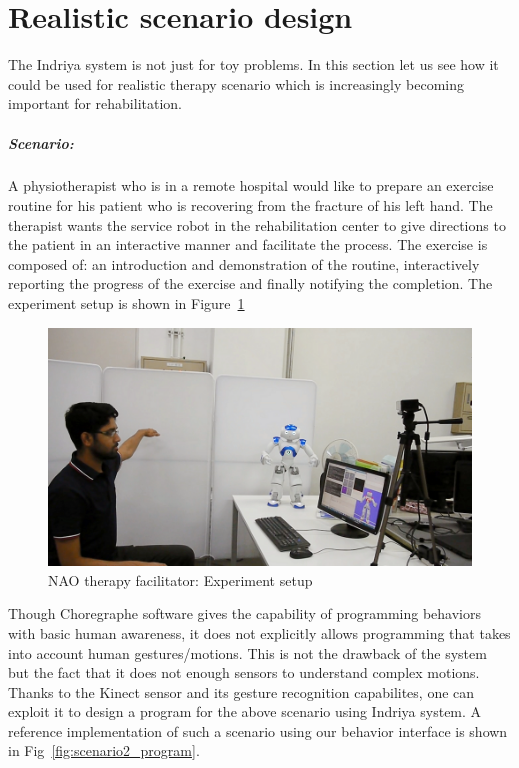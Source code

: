 \section{Realistic scenario design}
The Indriya system is not just for toy problems. In this section let us see how it could be used for realistic therapy scenario which is increasingly becoming important for rehabilitation. 
\subparagraph{Scenario:}A physiotherapist who is in a remote hospital would like to prepare an exercise routine for his patient who is recovering from the fracture of his left hand. The therapist wants the service robot in the rehabilitation center to give directions to the patient in an interactive manner and facilitate the process. The exercise is composed of: an introduction and demonstration of the routine, interactively reporting the progress of the exercise and finally notifying the completion. The experiment setup is shown in Figure~\ref{fig:scenario2_setup}
\begin{figure}[H]
\centering
\includegraphics[width=\textwidth]{../thesis/assets/scenario_therapy.png}
\caption[NAO therapy facilitator: Experiment setup]{NAO therapy facilitator: Experiment setup}
\label{fig:scenario2_setup}
\end{figure}
Though Choregraphe software gives the capability of programming behaviors with basic human awareness, it does not explicitly allows programming that takes into account human gestures/motions. This is not the drawback of the system but the fact that it does not enough sensors to understand complex motions. Thanks to the Kinect sensor and its gesture recognition capabilites, one can exploit it to design a program for the above scenario using Indriya system. A reference implementation of such a scenario using our behavior interface is shown in Fig~\ref{fig:scenario2_program}.
